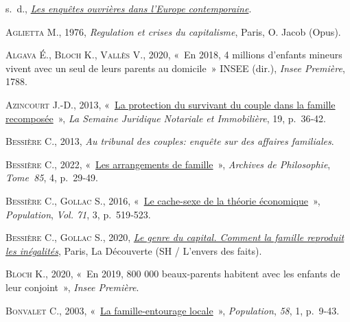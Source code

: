 \documentclass[
  12pt,
]{book}
\newlength{\cslhangindent}
\newenvironment{CSLReferences}[2] %
 {\begin{list}{}{%
  \setlength{\itemindent}{0pt}
  \setlength{\leftmargin}{0pt}
  \setlength{\parsep}{0pt}
  \ifodd #1
   \setlength{\leftmargin}{\cslhangindent}
   \setlength{\itemindent}{-1\cslhangindent}
  \fi
  \setlength{\itemsep}{#2\baselineskip}}}
 {\end{list}}
\begin{document}
\label{refs}
\begin{CSLReferences}{0}{1}
s.~d.,
\emph{\href{http://www.cairn.info/les-enquetes-ouvrieres-dans-l-europe-contemporaine--9782707199843.htm}{Les
enquêtes ouvrières dans l'Europe contemporaine}}.

\textsc{Aglietta M.}, 1976, \emph{Regulation et crises du capitalisme},
Paris, O. Jacob (Opus).

\textsc{Algava É.}, \textsc{Bloch K.}, \textsc{Vallès V.}, 2020, {«~En
2018, 4 millions d{'}enfants mineurs vivent avec un seul de leurs
parents au domicile~»} \textsc{INSEE} (dir.), \emph{Insee Première},
1788.

\textsc{Azincourt J.-D.}, 2013,
{«~\href{https://halshs.archives-ouvertes.fr/halshs-00825353}{La
protection du survivant du couple dans la famille recomposée}~»},
\emph{La Semaine Juridique Notariale et Immobilière}, 19, p.~36‑42.

\textsc{Bessière C.}, 2013, \emph{Au tribunal des couples: enquête sur
des affaires familiales}.

\textsc{Bessière C.}, 2022,
{«~\href{https://doi.org/10.3917/aphi.854.0029}{Les arrangements de
famille}~»}, \emph{Archives de Philosophie}, \emph{Tome~85}, 4,
p.~29‑49.

\textsc{Bessière C.}, \textsc{Gollac S.}, 2016,
{«~\href{https://www.cairn.info/revue-population-2016-3-page-519.htm}{Le
cache-sexe de la théorie économique}~»}, \emph{Population}, \emph{Vol.
71}, 3, p.~519‑523.

\textsc{Bessière C.}, \textsc{Gollac S.}, 2020,
\emph{\href{https://www.cairn.info/le-genre-du-capital--9782348044380.htm}{Le
genre du capital. Comment la famille reproduit les inégalités}}, Paris,
La Découverte (SH / L'envers des faits).

\textsc{Bloch K.}, 2020, {«~En 2019, 800 000 beaux-parents habitent avec
les enfants de leur conjoint~»}, \emph{Insee Première}.

\textsc{Bonvalet C.}, 2003,
{«~\href{https://doi.org/10.3917/popu.301.0009}{La famille-entourage
locale}~»}, \emph{Population}, \emph{58}, 1, p.~9‑43.


\end{CSLReferences}
\end{document}

